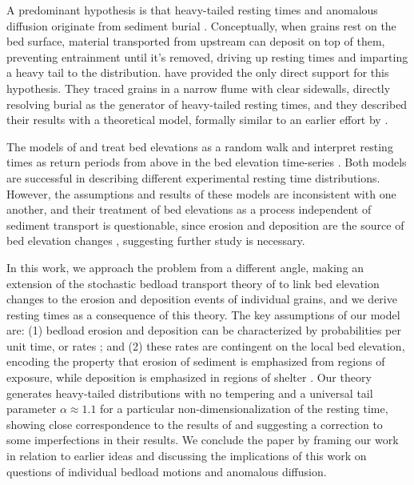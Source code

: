 \documentclass[draft]{agujournal2018}
\begin{document}
A predominant hypothesis is that heavy-tailed resting times and anomalous diffusion originate from sediment burial \citep{Voepel2013,Martin2014,Wu2019}.
Conceptually, when grains rest on the bed surface, material transported from upstream can deposit on top of them, preventing entrainment until it's removed, driving up resting times and imparting a heavy tail to the distribution.
\citet{Martin2014} have provided the only direct support for this hypothesis.
They traced grains in a narrow flume with clear sidewalls, directly resolving burial as the generator of heavy-tailed resting times, and they described their results with a theoretical model, formally similar to an earlier effort by \citet{Voepel2013}.

The models of \citet{Voepel2013} and \citet{Martin2014} treat bed elevations as a random walk and interpret resting times as return periods from above in the bed elevation time-series \citep[e.g.][]{Redner2007}.
Both models are successful in describing different experimental resting time distributions.
However, the assumptions and results of these models are inconsistent with one another, and their treatment of bed elevations as a process independent of sediment transport is questionable, since erosion and deposition are the source of bed elevation changes \citep[e.g.][]{Wong2007}, suggesting further study is necessary.

In this work, we approach the problem from a different angle, making an extension of the stochastic bedload transport theory of \citet{Ancey2008} to link bed elevation changes to the erosion and deposition events of individual grains, and we derive resting times as a consequence of this theory.
The key assumptions of our model are: (1) bedload erosion and deposition can be characterized by probabilities per unit time, or rates \citep[e.g.][]{Einstein1950, Ancey2008}; and (2) these rates are contingent on the local bed elevation, encoding the property that erosion of sediment is emphasized from regions of exposure, while deposition is emphasized in regions of shelter \citep[e.g.][]{Sawai1987, Wong2007}.
Our theory generates heavy-tailed distributions with no tempering and a universal tail parameter $\alpha \approx 1.1$ for a particular non-dimensionalization of the resting time, showing close correspondence to the results of \citet{Martin2014} and suggesting a correction to some imperfections in their results.
We conclude the paper by framing our work in relation to earlier ideas and discussing the implications of this work on questions of individual bedload motions and anomalous diffusion.
\end{document}
